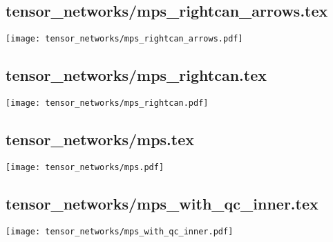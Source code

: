\documentclass{article}
\begin{document}
		\subsection{tensor\_networks/mps\_rightcan\_arrows.tex}
		\texttt{[image: tensor\_networks/mps\_rightcan\_arrows.pdf]}
		\subsection{tensor\_networks/mps\_rightcan.tex}
		\texttt{[image: tensor\_networks/mps\_rightcan.pdf]}
		\subsection{tensor\_networks/mps.tex}
		\texttt{[image: tensor\_networks/mps.pdf]}
		\subsection{tensor\_networks/mps\_with\_qc\_inner.tex}
		\texttt{[image: tensor\_networks/mps\_with\_qc\_inner.pdf]}
\end{document}
